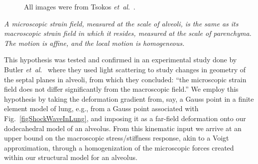\begin{figure}
    \centering
    \hfill
    \hfill
    \caption{All images were from Tsokos \textit{et~al}.\ \cite{Tsokosetal03}.}
    \label{figAlveolarDamage}
\end{figure}

\newpage
\begin{conj}
\textit{A micro\-scopic strain field, measured at the scale of alveoli, is the same as its macro\-scopic strain field in which it resides, measured at the scale of parenchyma.  The motion is affine, and the local motion is homogeneous.}  
\label{conjecture}
\end{conj}

This hypothesis was tested and confirmed in an experimental study done by Butler \textit{et~al}.\ \cite{Butleretal96} where they used light scattering to study changes in geometry of the septal planes in alveoli, from which they concluded: ``the micro\-scopic strain field does not differ significantly from the macro\-scopic field.''  We employ this hypothesis by taking the deformation gradient from, say, a Gauss point in a finite element model of lung, e.g., from a Gauss point associated with Fig.~\ref{figShockWaveInLung}, and imposing it as a far-field deformation onto our dodecahedral model of an alveolus.  From this kinematic input we arrive at an upper bound on the macro\-scopic stress\slash stiffness response, akin to a Voigt approximation, through a homogenization of the micro\-scopic forces created within our structural model for an alveolus.

